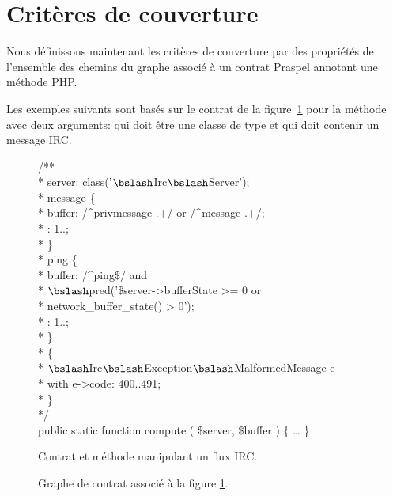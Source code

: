 \section{Critères de couverture}
\label{section:test:criteria}

Nous définissons maintenant les critères de couverture par des propriétés de
l'ensemble des chemins du graphe associé à un contrat Praspel annotant une
méthode PHP.

Les exemples suivants sont basés sur le contrat de la
figure~\ref{figure:test:irc} pour la méthode  avec deux arguments:
 qui doit être une classe de type
 et  qui doit contenir un message
IRC.
%
\begin{figure}

\begin{bigpre}
/** \\
 * \arequires server: class('\(\bslash\)Irc\(\bslash\)Server'); \\
 * \abehavior message \{ \\
 *     \arequires buffer: /^privmessage .+/ or /^message .+/; \\
 *     \aensures  \aresult: 1..; \\
 * \} \\
 * \abehavior ping \{ \\
 *     \arequires buffer: /^ping\$/ and \\
 *               \(\bslash\)pred('\$server->bufferState   >= 0 or \\
 *                      network\_buffer\_state() >  0'); \\
 *     \aensures  \aresult: 1..; \\
 * \} \\
 * \adefault \{ \\
 *     \athrowable \(\bslash\)Irc\(\bslash\)Exception\(\bslash\)MalformedMessage e \\
 *                    with e->code: 400..491; \\
 * \} \\
 */ \\
public static function compute ( \$server, \$buffer ) \{ … \}
\end{bigpre}

\caption{\label{figure:test:irc} Contrat et méthode manipulant un flux IRC.}

\end{figure}
%
\begin{figure}


\caption{\label{figure:test:irc_graph} Graphe de contrat associé à la figure
\ref{figure:test:irc}.}

\end{figure}
